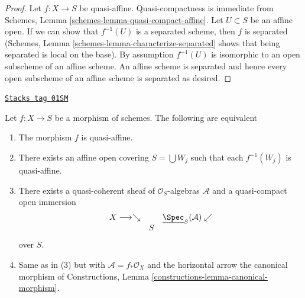 \begin{proof}
Let $f : X \to S$ be quasi-affine.
Quasi-compactness is immediate from
Schemes, Lemma \ref{schemes-lemma-quasi-compact-affine}.
Let $U \subset S$ be an affine open. If we can show that
$f^{-1}(U)$ is a separated scheme, then $f$ is separated
(Schemes, Lemma \ref{schemes-lemma-characterize-separated}
shows that being separated is local on the base).
By assumption $f^{-1}(U)$ is isomorphic to an open subscheme
of an affine scheme. An affine scheme is separated and hence
every open subscheme of an affine scheme is separated as desired.
\end{proof}

\begin{lemma}
\label{morphisms-lemma-characterize-quasi-affine}
\href{https://stacks.math.columbia.edu/tag/01SM}{\texttt{Stacks tag 01SM}}

Let $f : X \to S$ be a morphism of schemes.
The following are equivalent
\begin{enumerate}
\item The morphism $f$ is quasi-affine.
\item There exists an affine open covering $S = \bigcup W_j$
such that each $f^{-1}(W_j)$ is quasi-affine.
\item There exists a quasi-coherent sheaf of $\mathcal{O}_S$-algebras
$\mathcal{A}$ and a quasi-compact open immersion
$$
\begin{array}{ccc}X \longrightarrow\searrow &  & \underline{\Spec}_S(\mathcal{A}) \swarrow \\  & S & \end{array}
$$
over $S$.
\item Same as in (3) but with $\mathcal{A} = f_*\mathcal{O}_X$
and the horizontal arrow the canonical morphism of
Constructions, Lemma \ref{constructions-lemma-canonical-morphism}.
\end{enumerate}
\end{lemma}

